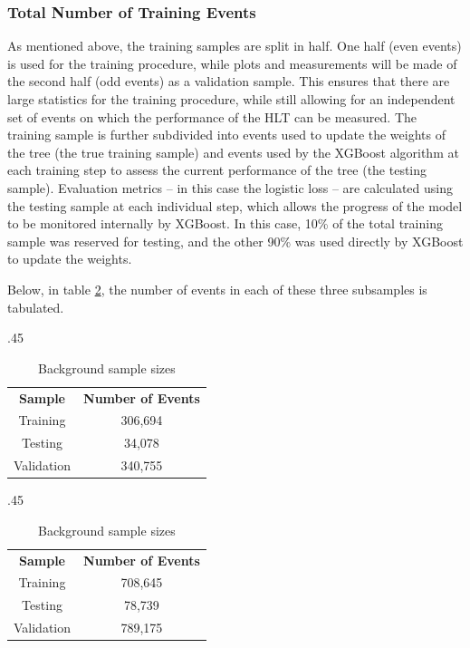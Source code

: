 \documentclass[12pt]{ucsddissertation}
\begin{document}
\subsubsection{Total Number of Training Events}\label{sec:HLTSampleSizes}
As mentioned above, the training samples are split in half. One half (even events) is used for the training procedure, while plots and measurements will be made of the second half (odd events) as a validation sample. This ensures that there are large statistics for the training procedure, while still allowing for an independent set of events on which the performance of the HLT can be measured. The training sample is further subdivided into events used to update the weights of the tree (the true training sample) and events used by the XGBoost algorithm at each training step to assess the current performance of the tree (the testing sample). Evaluation metrics -- in this case the logistic loss -- are calculated using the testing sample at each individual step, which allows the progress of the model to be monitored internally by XGBoost. In this case, 10\% of the total training sample was reserved for testing, and the other 90\% was used directly by XGBoost to update the weights.

Below, in table \ref{tab:HLTSampleSizes}, the number of events in each of these three subsamples is tabulated. 

\begin{table}
    \centering
    \caption{Signal and Background sample sizes for the training, testing, and validation samples.}
	\label{tab:HLTSampleSizes}
    \begin{subtable}{.45\textwidth}
        \centering
        \caption{Signal sample sizes}
        \begin{tabular}{|c|c|}
            \hline
            \textbf{Sample} & \textbf{Number of Events} \\
			\Xhline{2pt}
            Training & 306,694 \\ \hline
            Testing & 34,078 \\ \hline
            Validation & 340,755 \\ \hline
        \end{tabular}
    \end{subtable}
    \hfill
    \begin{subtable}{.45\textwidth}
        \centering
        \caption{Background sample sizes}
        \begin{tabular}{|c|c|}
            \hline
			\textbf{Sample} & \textbf{Number of Events} \\
			\Xhline{2pt}
            Training & 708,645 \\ \hline
            Testing & 78,739 \\ \hline
            Validation & 789,175 \\ \hline
        \end{tabular}
    \end{subtable}
\end{table}
\end{document}
